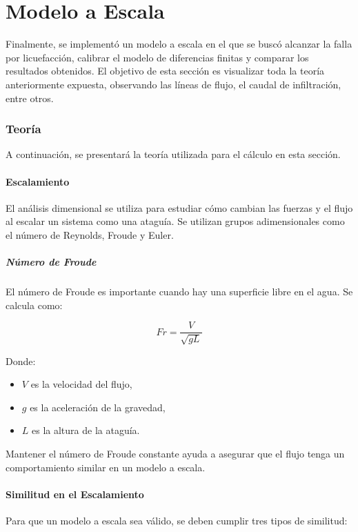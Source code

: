 \part{Modelo a Escala}

Finalmente, se implementó un modelo a escala en el que se buscó alcanzar la falla por licuefacción, calibrar el modelo de diferencias finitas y comparar los resultados obtenidos. El objetivo de esta sección es visualizar toda la teoría anteriormente expuesta, observando las líneas de flujo, el caudal de infiltración, entre otros.

\section{Teoría}

A continuación, se presentará la teoría utilizada para el cálculo en esta sección.

\subsection{Escalamiento}
El análisis dimensional se utiliza para estudiar cómo cambian las fuerzas y el flujo al escalar un sistema como una ataguía. Se utilizan grupos adimensionales como el número de Reynolds, Froude y Euler.

\subsubsection{Número de Froude}
El número de Froude es importante cuando hay una superficie libre en el agua. Se calcula como:

\begin{equation}
Fr = \frac{V}{\sqrt{g L}}
\end{equation}

Donde:
\begin{itemize}
    \item $V$ es la velocidad del flujo,
    \item $g$ es la aceleración de la gravedad,
    \item $L$ es la altura de la ataguía.
\end{itemize}

Mantener el número de Froude constante ayuda a asegurar que el flujo tenga un comportamiento similar en un modelo a escala. \textbf{\cite{munson2011}}
\subsection{Similitud en el Escalamiento}
Para que un modelo a escala sea válido, se deben cumplir tres tipos de similitud:

